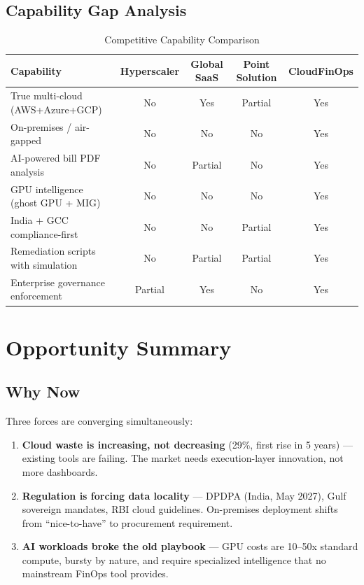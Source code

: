 \documentclass[a4paper,11pt]{article}
\begin{document}
\subsection{Capability Gap Analysis}

\begin{table}[H]
\centering
\begin{tabularx}{\textwidth}{Xcccc}
\toprule
\textbf{Capability} & \textbf{Hyperscaler} & \textbf{Global SaaS} & \textbf{Point Solution} & \textbf{CloudFinOps} \\
\midrule
True multi-cloud (AWS+Azure+GCP) & No & Yes & Partial & Yes \\
On-premises / air-gapped & No & No & No & Yes \\
AI-powered bill PDF analysis & No & Partial & No & Yes \\
GPU intelligence (ghost GPU + MIG) & No & No & No & Yes \\
India + GCC compliance-first & No & No & Partial & Yes \\
Remediation scripts with simulation & No & Partial & Partial & Yes \\
Enterprise governance enforcement & Partial & Yes & No & Yes \\
\bottomrule
\end{tabularx}
\caption{Competitive Capability Comparison}
\end{table}

\section{Opportunity Summary}

\subsection{Why Now}

Three forces are converging simultaneously:

\begin{enumerate}[itemsep=2mm]
    \item \textbf{Cloud waste is increasing, not decreasing} (29\%, first rise in 5 years) --- existing tools are failing. The market needs execution-layer innovation, not more dashboards.

    \item \textbf{Regulation is forcing data locality} --- DPDPA (India, May 2027), Gulf sovereign mandates, RBI cloud guidelines. On-premises deployment shifts from ``nice-to-have'' to procurement requirement.

    \item \textbf{AI workloads broke the old playbook} --- GPU costs are 10--50x standard compute, bursty by nature, and require specialized intelligence that no mainstream FinOps tool provides.
\end{enumerate}
\end{document}
